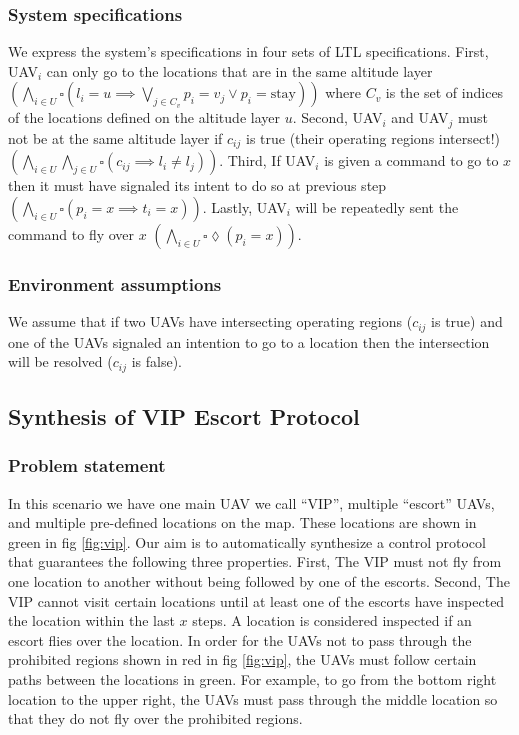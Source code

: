 \documentclass[]{article}
\begin{document}
\subsubsection{System specifications}\label{system-specifications}

We express the system's specifications in four sets of LTL specifications. 
First, UAV$_{i}$ can only go to the locations that are in the same altitude layer $(\bigwedge\limits_{i \in U} \square (l_{i} = 
u \implies \bigvee\limits_{j\in C_{v}} p_{i} = v_{j} \lor p_{i} = \text{stay}))$ where $C_{v}$ is the set of indices of the
locations defined on the altitude layer $u$. Second, UAV$_{i}$ and UAV$_{j}$ must not 
be at the same altitude layer if $c_{ij}$ is true (their operating regions intersect!) 
$(\bigwedge\limits_{i\in U} \bigwedge\limits_{j\in U} \square (c_{ij} \implies l_{i} \neq l_{j}))$. Third, If UAV$_{i}$ is given a command to go 
to $x$ then it must have signaled its intent to do so at previous step 
$(\bigwedge\limits_{i \in U} \square (p_{i} = x \implies t_{i} = x))$. Lastly, UAV$_{i}$ will be repeatedly sent the command to fly over $x$ $(\bigwedge\limits_{i \in U} \square \lozenge (p_{i} = x))$.

\subsubsection{Environment assumptions}\label{environment-assumptions}


We assume that if two UAVs have intersecting operating regions ($c_{ij}$ is true) and 
one of the UAVs signaled an intention to go to a location then the intersection 
will be resolved ($c_{ij}$ is false).


\subsection{Synthesis of VIP Escort Protocol}\label{vip-escort}

\subsubsection{Problem statement}\label{problem-statement}

In this scenario we have one main UAV we call ``VIP'', multiple ``escort'' UAVs, 
and multiple pre-defined locations on the map. These locations are shown in 
green in fig \ref{fig:vip}. Our aim is to automatically synthesize a control protocol that 
guarantees the following three properties. First, The VIP must not fly from one 
location to another without being followed by one of the escorts. Second, The VIP 
cannot visit certain locations until at least one of the escorts have inspected the 
location within the last $x$ steps. A location is considered inspected if an escort 
flies over the location. In order for the UAVs not to pass through the prohibited 
regions shown in red in fig \ref{fig:vip}, the UAVs must follow certain paths between the 
locations in green. For example, to go from the bottom right location to the 
upper right, the UAVs must pass through the middle location so that they do not fly 
over the prohibited regions.
\end{document}
